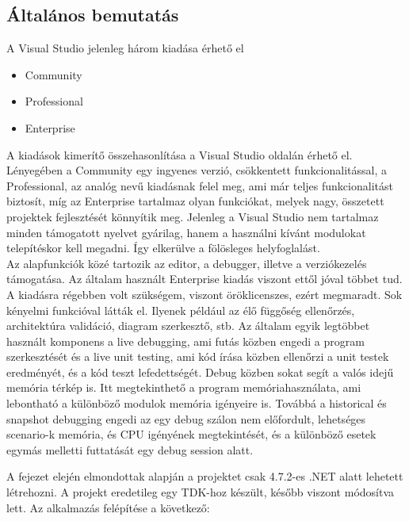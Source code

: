\subsection{Általános bemutatás}
A Visual Studio jelenleg három kiadása érhető el 
\begin{itemize}
\item Community 
\item Professional
\item Enterprise
\end{itemize}
A kiadások kimerítő összehasonlítása a Visual Studio oldalán érhető el.\cite{vscompare} Lényegében a Community egy ingyenes verzió, csökkentett funkcionalitással, a Professional, az analóg nevű kiadásnak felel meg, ami már teljes funkcionalitást biztosít, míg az Enterprise tartalmaz olyan funkciókat, melyek nagy, összetett projektek fejlesztését könnyítik meg. Jelenleg a Visual Studio nem tartalmaz minden támogatott nyelvet gyárilag, hanem a használni kívánt modulokat telepítéskor kell megadni. Így elkerülve a fölösleges helyfoglalást.\\
Az alapfunkciók közé tartozik az editor, a debugger, illetve a verziókezelés támogatása. Az általam használt Enterprise kiadás viszont ettől jóval többet tud. A kiadásra régebben volt szükségem, viszont öröklicenszes, ezért megmaradt. Sok kényelmi funkcióval látták el. Ilyenek például az élő függőség ellenőrzés, architektúra validáció, diagram szerkesztő, stb. Az általam egyik legtöbbet használt komponens a live debugging, ami futás közben engedi a program szerkesztését és a live unit testing, ami kód írása közben ellenőrzi a unit testek eredményét, és a kód teszt lefedettségét. Debug közben sokat segít a valós idejű memória térkép is. Itt megtekinthető a program memóriahasználata, ami lebontható a különböző modulok memória igényeire is. Továbbá a historical és snapshot debugging engedi az egy debug szálon nem előfordult, lehetséges scenario-k memória, és CPU igényének megtekintését, és a különböző esetek egymás melletti futtatását egy debug session alatt. 

A fejezet elején elmondottak alapján a projektet csak 4.7.2-es .NET alatt lehetett létrehozni. A projekt eredetileg egy TDK-hoz készült, később viszont módosítva lett. Az alkalmazás felépítése a következő: 

